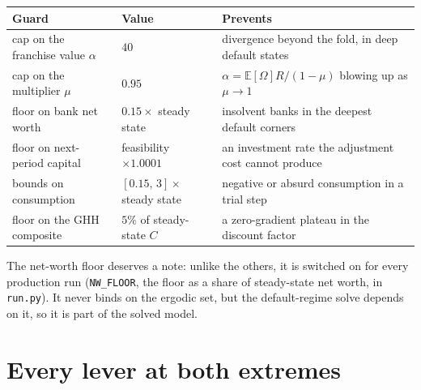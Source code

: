 \documentclass[10pt,a4paper]{article}
\theoremstyle{plain}
\theoremstyle{remark}
\newcommand{\E}{\mathbb{E}}
\newcommand{\file}[1]{\textcolor{codecol}{\texttt{#1}}}
\newcommand{\code}[1]{\texttt{#1}}
\begin{document}
\begin{center}\small
\begin{tabular}{@{}>{\raggedright\arraybackslash}p{}>{\raggedright\arraybackslash}p{}>{\raggedright\arraybackslash}p{}@{}}
\toprule
Guard & Value & Prevents \\
\midrule
cap on the franchise value $\alpha$ & $40$ & divergence beyond the fold, in deep default states \\
cap on the multiplier $\mu$ & $0.95$ & $\alpha=\E[\Omega]R/(1-\mu)$ blowing up as $\mu\to1$ \\
floor on bank net worth & $0.15\times$ steady state & insolvent banks in the deepest default corners \\
floor on next-period capital & feasibility $\times1.0001$ & an investment rate the adjustment cost cannot produce \\
bounds on consumption & $[0.15,\,3]\times$ steady state & negative or absurd consumption in a trial step \\
floor on the GHH composite & $5\%$ of steady-state $C$ & a zero-gradient plateau in the discount factor \\
\bottomrule
\end{tabular}
\end{center}

\noindent The net-worth floor deserves a note: unlike the others, it is switched on for every
production run (\code{NW\_FLOOR}, the floor as a share of steady-state net worth, in \file{run.py}). It
never binds on the ergodic set, but the default-regime solve depends on it, so it is part of the
solved model.

\section{Every lever at both extremes}
\end{document}
